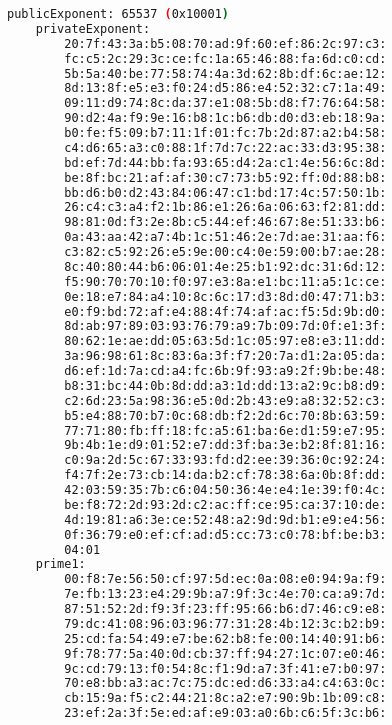 \begin{lstlisting}[language=bash, caption=Elements in the RSA algorithm,
    label={lst:rsa_element}]
    publicExponent: 65537 (0x10001) 
    privateExponent: 
        20:7f:43:3a:b5:08:70:ad:9f:60:ef:86:2c:97:c3: 
        fc:c5:2c:29:3c:ce:fc:1a:65:46:88:fa:6d:c0:cd: 
        5b:5a:40:be:77:58:74:4a:3d:62:8b:df:6c:ae:12: 
        8d:13:8f:e5:e3:f0:24:d5:86:e4:52:32:c7:1a:49: 
        09:11:d9:74:8c:da:37:e1:08:5b:d8:f7:76:64:58: 
        90:d2:4a:f9:9e:16:b8:1c:b6:db:d0:d3:eb:18:9a: 
        b0:fe:f5:09:b7:11:1f:01:fc:7b:2d:87:a2:b4:58: 
        c4:d6:65:a3:c0:88:1f:7d:7c:22:ac:33:d3:95:38: 
        bd:ef:7d:44:bb:fa:93:65:d4:2a:c1:4e:56:6c:8d: 
        be:8f:bc:21:af:af:30:c7:73:b5:92:ff:0d:88:b8: 
        bb:d6:b0:d2:43:84:06:47:c1:bd:17:4c:57:50:1b: 
        26:c4:c3:a4:f2:1b:86:e1:26:6a:06:63:f2:81:dd: 
        98:81:0d:f3:2e:8b:c5:44:ef:46:67:8e:51:33:b6: 
        0a:43:aa:42:a7:4b:1c:51:46:2e:7d:ae:31:aa:f6: 
        c3:82:c5:92:26:e5:9e:00:c4:0e:59:00:b7:ae:28: 
        8c:40:80:44:b6:06:01:4e:25:b1:92:dc:31:6d:12: 
        f5:90:70:70:10:f0:97:e3:8a:e1:bc:11:a5:1c:ce: 
        0e:18:e7:84:a4:10:8c:6c:17:d3:8d:d0:47:71:b3: 
        e0:f9:bd:72:af:e4:88:4f:74:af:ac:f5:5d:9b:d0: 
        8d:ab:97:89:03:93:76:79:a9:7b:09:7d:0f:e1:3f: 
        80:62:1e:ae:dd:05:63:5d:1c:05:97:e8:e3:11:dd: 
        3a:96:98:61:8c:83:6a:3f:f7:20:7a:d1:2a:05:da: 
        d6:ef:1d:7a:cd:a4:fc:6b:9f:93:a9:2f:9b:be:48: 
        b8:31:bc:44:0b:8d:dd:a3:1d:dd:13:a2:9c:b8:d9: 
        c2:6d:23:5a:98:36:e5:0d:2b:43:e9:a8:32:52:c3: 
        b5:e4:88:70:b7:0c:68:db:f2:2d:6c:70:8b:63:59: 
        77:71:80:fb:ff:18:fc:a5:61:ba:6e:d1:59:e7:95: 
        9b:4b:1e:d9:01:52:e7:dd:3f:ba:3e:b2:8f:81:16: 
        c0:9a:2d:5c:67:33:93:fd:d2:ee:39:36:0c:92:24: 
        f4:7f:2e:73:cb:14:da:b2:cf:78:38:6a:0b:8f:dd: 
        42:03:59:35:7b:c6:04:50:36:4e:e4:1e:39:f0:4c: 
        be:f8:72:2d:93:2d:c2:ac:ff:ce:95:ca:37:10:de: 
        4d:19:81:a6:3e:ce:52:48:a2:9d:9d:b1:e9:e4:56: 
        0f:36:79:e0:ef:cf:ad:d5:cc:73:c0:78:bf:be:b3: 
        04:01 
    prime1: 
        00:f8:7e:56:50:cf:97:5d:ec:0a:08:e0:94:9a:f9: 
        7e:fb:13:23:e4:29:9b:a7:9f:3c:4e:70:ca:a9:7d: 
        87:51:52:2d:f9:3f:23:ff:95:66:b6:d7:46:c9:e8: 
        79:dc:41:08:96:03:96:77:31:28:4b:12:3c:b2:b9: 
        25:cd:fa:54:49:e7:be:62:b8:fe:00:14:40:91:b6: 
        9f:78:77:5a:40:0d:cb:37:ff:94:27:1c:07:e0:46: 
        9c:cd:79:13:f0:54:8c:f1:9d:a7:3f:41:e7:b0:97: 
        70:e8:bb:a3:ac:7c:75:dc:ed:d6:33:a4:c4:63:0c: 
        cb:15:9a:f5:c2:44:21:8c:a2:e7:90:9b:1b:09:c8: 
        23:ef:2a:3f:5e:ed:af:e9:03:a0:6b:c6:5f:3c:b6: 

\end{lstlisting}
